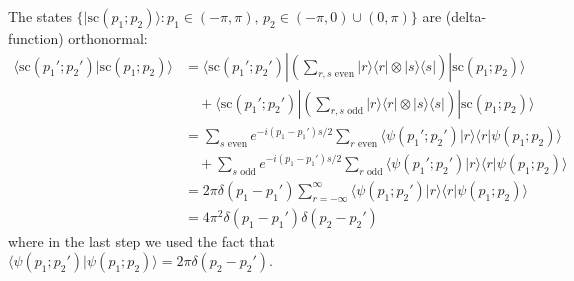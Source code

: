\documentclass[../thesis-main/thesis-main]{subfiles}
\begin{document}
The states $\{|\mathrm{sc}(p_1;p_2)\rangle \colon p_1\in (-\pi,\pi),\,p_2\in(-\pi,0)\cup(0,\pi)\}$ are (delta-function) orthonormal:
\begin{align*}
\langle  \mathrm{sc}(p_1';p_2')|\mathrm{sc}(p_1;p_2)\rangle &= \langle \mathrm{sc}(p_1'; p_2')|\left(\sum_{\text{$r,s$ even}}|r\rangle\langle r| \otimes |s\rangle \langle s| \right)|\mathrm{sc}(p_1;p_2)\rangle\\
&\quad + \langle \mathrm{sc}(p_1'; p_2')|\left(\sum_{\text{$r,s$ odd}}|r\rangle \langle r|\otimes  |s\rangle \langle s|\right)|\mathrm{sc}(p_1;p_2)\rangle\\
&= \sum_{\text{$s$ even}} e^{-i(p_1-p_1') {s}/{2}}\sum_{\text{$r$ even}}\langle \psi(p_1';p_2')|r\rangle\langle r|\psi(p_1;p_2)\rangle \\
& \quad + \sum_{\text{$s$ odd}} e^{-i(p_1-p_1') {s}/{2}}\sum_{\text{$r$ odd}}\langle  \psi(p_1';p_2')|r\rangle\langle r|\psi(p_1;p_2)\rangle\\
&= 2\pi \delta(p_1-p_1') \sum_{r=-\infty}^{\infty}\langle \psi(p_1;p_2')|r\rangle\langle r|\psi(p_1;p_2)\rangle\\
&= 4\pi^2 \delta(p_1-p_1')\delta(p_2-p_2')
\end{align*}
where in the last step we used the fact that $\langle\psi(p_1;p_2')|\psi(p_1;p_2)\rangle=2\pi\delta(p_2-p_2')$.
%
%  
%  
%     
%
%
%  
%
%  
%
%  
% 
%    
\end{document}
